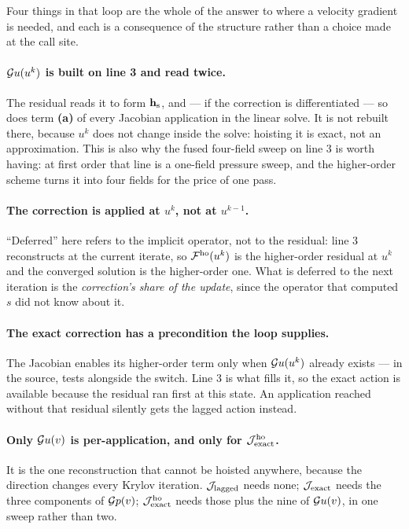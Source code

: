 Four things in that loop are the whole of the answer to where a velocity gradient is needed, and
each is a consequence of the structure rather than a choice made at the call site.

\paragraph{$\mathcal{G} u(u^k)$ is built on line 3 and read twice.} The residual reads it to form
$\mathbf{h}_{\mathrm{s}}$, and --- if the correction is differentiated --- so does term \textbf{(a)} of
every Jacobian application in the linear solve. It is not rebuilt there, because $u^k$ does not
change inside the solve: hoisting it is exact, not an approximation. This is also why the fused
four-field sweep on line 3 is worth having: at first order that line is a one-field pressure
sweep, and the higher-order scheme turns it into four fields for the price of one pass.

\paragraph{The correction is applied at $u^k$, not at $u^{k-1}$.} ``Deferred'' here refers to the
implicit operator, not to the residual: line 3 reconstructs at the current iterate, so
$\mathcal{F}^{\mathrm{ho}}(u^k)$ is the higher-order residual at $u^k$ and the converged solution is the higher-order
one. What is deferred to the next iteration is the \emph{correction's share of the update}, since
the operator that computed $s$ did not know about it.

\paragraph{The exact correction has a precondition the loop supplies.} The Jacobian enables its
higher-order term only when $\mathcal{G} u(u^k)$ already exists --- in the source,
 tests  alongside the switch. Line 3 is what fills it, so the
exact action is available because the residual ran first at this state. An application reached
without that residual silently gets the lagged action instead.

\paragraph{Only $\mathcal{G} u(v)$ is per-application, and only for $\mathcal{J}^{\mathrm{ho}}_{\mathrm{exact}}$.} It is the one
reconstruction that cannot be hoisted anywhere, because the direction changes every Krylov
iteration. $\mathcal{J}_{\mathrm{lagged}}$ needs none; $\mathcal{J}_{\mathrm{exact}}$ needs the three components of $\mathcal{G} p(v)$; $\mathcal{J}^{\mathrm{ho}}_{\mathrm{exact}}$ needs
those plus the nine of $\mathcal{G} u(v)$, in one sweep rather than two.

